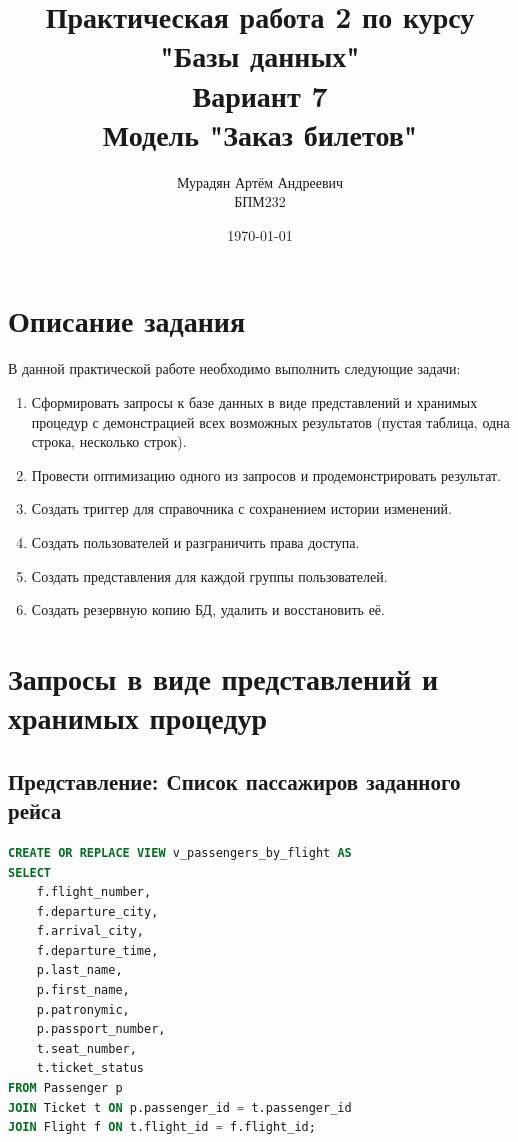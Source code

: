 \documentclass[a4paper,12pt]{article}
\title{Практическая работа 2 по курсу\\
"Базы данных"\\
Вариант 7\\
Модель "Заказ билетов"}
\author{Мурадян Артём Андреевич\\
БПМ232}
\date{\today}
\begin{document}
\maketitle
\newpage

\tableofcontents
\newpage

\section{Описание задания}

В данной практической работе необходимо выполнить следующие задачи:
\begin{enumerate}
    \item Сформировать запросы к базе данных в виде представлений и хранимых процедур с демонстрацией всех возможных результатов (пустая таблица, одна строка, несколько строк).
    \item Провести оптимизацию одного из запросов и продемонстрировать результат.
    \item Создать триггер для справочника с сохранением истории изменений.
    \item Создать пользователей и разграничить права доступа.
    \item Создать представления для каждой группы пользователей.
    \item Создать резервную копию БД, удалить и восстановить её.
\end{enumerate}

\section{Запросы в виде представлений и хранимых процедур}

\subsection{Представление: Список пассажиров заданного рейса}

\begin{lstlisting}[language=SQL, caption=Создание представления v\_passengers\_by\_flight]
CREATE OR REPLACE VIEW v_passengers_by_flight AS
SELECT 
    f.flight_number,
    f.departure_city,
    f.arrival_city,
    f.departure_time,
    p.last_name,
    p.first_name,
    p.patronymic,
    p.passport_number,
    t.seat_number,
    t.ticket_status
FROM Passenger p
JOIN Ticket t ON p.passenger_id = t.passenger_id
JOIN Flight f ON t.flight_id = f.flight_id;
\end{lstlisting}
\end{document}
